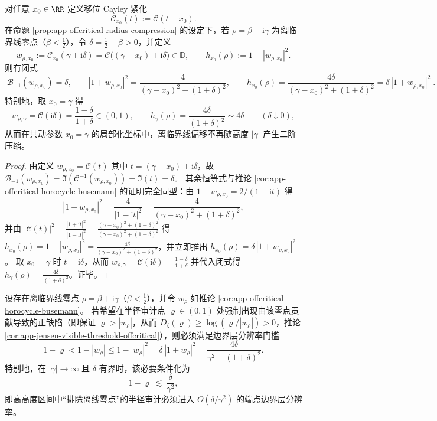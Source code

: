\begin{theorem}\label{thm:app-comoving-horizon-localization}
对任意 \(x_{0}\in\RR\) 定义移位 Cayley 紧化
\[
\mathcal{C}_{x_{0}}(t):=\mathcal{C}(t-x_{0}).
\]
在命题 \ref{prop:app-offcritical-radius-compression} 的设定下，若 \(\rho=\beta+\mathrm{i}\gamma\) 为离临界线零点（\(\beta<\tfrac12\)），令 \(\delta=\tfrac12-\beta>0\)，并定义
\[
w_{\rho,x_{0}}:=\mathcal{C}_{x_{0}}(\gamma+\mathrm{i}\delta)=\mathcal{C}\bigl((\gamma-x_{0})+\mathrm{i}\delta\bigr)\in\mathbb{D},
\qquad
h_{x_{0}}(\rho):=1-|w_{\rho,x_{0}}|^{2}.
\]
则有闭式
\[
\boxed{\;
\mathcal{B}_{-1}(w_{\rho,x_{0}})=\delta,\qquad
|1+w_{\rho,x_{0}}|^{2}=\frac{4}{(\gamma-x_{0})^{2}+(1+\delta)^{2}},\qquad
h_{x_{0}}(\rho)=\frac{4\delta}{(\gamma-x_{0})^{2}+(1+\delta)^{2}}
=\delta\,|1+w_{\rho,x_{0}}|^{2}\; }.
\]
特别地，取 \(x_{0}=\gamma\) 得
\[
w_{\rho,\gamma}=\mathcal{C}(\mathrm{i}\delta)=\frac{1-\delta}{1+\delta}\in(0,1),
\qquad
h_{\gamma}(\rho)=\frac{4\delta}{(1+\delta)^{2}}\sim 4\delta\qquad(\delta\downarrow 0),
\]
从而在共动参数 \(x_{0}=\gamma\) 的局部化坐标中，离临界线偏移不再随高度 \(|\gamma|\) 产生二阶压缩。
\end{theorem}

\begin{proof}
由定义 \(w_{\rho,x_{0}}=\mathcal{C}(t)\) 其中 \(t=(\gamma-x_{0})+\mathrm{i}\delta\)，故
\(
\mathcal{B}_{-1}(w_{\rho,x_{0}})=\Im(\mathcal{C}^{-1}(w_{\rho,x_{0}}))=\Im(t)=\delta
\)。
其余恒等式与推论 \ref{cor:app-offcritical-horocycle-busemann} 的证明完全同型：由 \(1+w_{\rho,x_{0}}=2/(1-\mathrm{i}t)\) 得
\[
|1+w_{\rho,x_{0}}|^{2}=\frac{4}{|1-\mathrm{i}t|^{2}}=\frac{4}{(\gamma-x_{0})^{2}+(1+\delta)^{2}},
\]
并由 \(|\mathcal{C}(t)|^{2}=\frac{|1+\mathrm{i}t|^{2}}{|1-\mathrm{i}t|^{2}}=\frac{(\gamma-x_{0})^{2}+(1-\delta)^{2}}{(\gamma-x_{0})^{2}+(1+\delta)^{2}}\) 得
\(
h_{x_{0}}(\rho)=1-|w_{\rho,x_{0}}|^{2}=\frac{4\delta}{(\gamma-x_{0})^{2}+(1+\delta)^{2}}
\)，并立即推出 \(h_{x_{0}}(\rho)=\delta\,|1+w_{\rho,x_{0}}|^{2}\)。
取 \(x_{0}=\gamma\) 时 \(t=\mathrm{i}\delta\)，从而 \(w_{\rho,\gamma}=\mathcal{C}(\mathrm{i}\delta)=\frac{1-\delta}{1+\delta}\) 并代入闭式得 \(h_{\gamma}(\rho)=\frac{4\delta}{(1+\delta)^{2}}\)。证毕。
\end{proof}

\begin{corollary}\label{cor:app-horocycle-visible-resolution}
设存在离临界线零点 \(\rho=\beta+\mathrm{i}\gamma\)（\(\beta<\tfrac12\)），并令 \(w_{\rho}\) 如推论 \ref{cor:app-offcritical-horocycle-busemann}。
若希望在半径审计点 \(\varrho\in(0,1)\) 处强制出现由该零点贡献导致的正缺陷（即保证 \(\varrho>|w_{\rho}|\)，从而 \(D_{\zeta}(\varrho)\ge \log(\varrho/|w_{\rho}|)>0\)，推论 \ref{cor:app-jensen-visible-threshold-offcritical}），则必须满足边界层分辨率门槛
\[
1-\varrho<1-|w_{\rho}|
\le 1-|w_{\rho}|^{2}
=\delta\,|1+w_{\rho}|^{2}
=\frac{4\delta}{\gamma^{2}+(1+\delta)^{2}}.
\]
特别地，在 \(|\gamma|\to\infty\) 且 \(\delta\) 有界时，该必要条件化为
\[
1-\varrho\ \lesssim\ \frac{\delta}{\gamma^{2}},
\]
即高高度区间中“排除离线零点”的半径审计必须进入 \(O(\delta/\gamma^{2})\) 的端点边界层分辨率。
\end{corollary}

